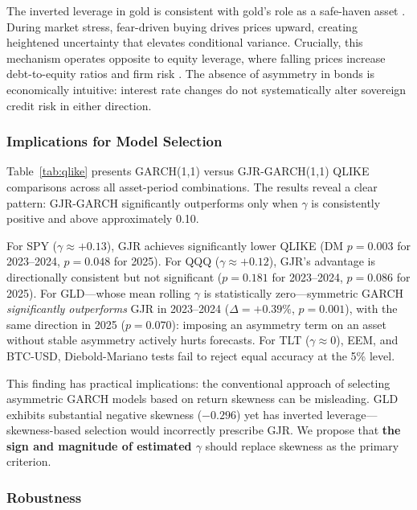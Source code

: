 The inverted leverage in gold is consistent with gold's role as a safe-haven asset \citep{baur2010safe,baur2010hedge}. During market stress, fear-driven buying drives prices upward, creating heightened uncertainty that elevates conditional variance. Crucially, this mechanism operates opposite to equity leverage, where falling prices increase debt-to-equity ratios and firm risk \citep{black1976,christie1982}. The absence of asymmetry in bonds is economically intuitive: interest rate changes do not systematically alter sovereign credit risk in either direction.

\subsubsection{Implications for Model Selection}
\label{sec:model_selection}

Table~\ref{tab:qlike} presents GARCH(1,1) versus GJR-GARCH(1,1) QLIKE comparisons across all asset-period combinations. The results reveal a clear pattern: GJR-GARCH significantly outperforms only when $\gamma$ is consistently positive and above approximately 0.10.

For SPY ($\gamma \approx +0.13$), GJR achieves significantly lower QLIKE (DM $p = 0.003$ for 2023--2024, $p = 0.048$ for 2025). For QQQ ($\gamma \approx +0.12$), GJR's advantage is directionally consistent but not significant ($p = 0.181$ for 2023--2024, $p = 0.086$ for 2025). For GLD---whose mean rolling $\gamma$ is statistically zero---symmetric GARCH \emph{significantly outperforms} GJR in 2023--2024 ($\Delta = +0.39\%$, $p = 0.001$), with the same direction in 2025 ($p = 0.070$): imposing an asymmetry term on an asset without stable asymmetry actively hurts forecasts. For TLT ($\gamma \approx 0$), EEM, and BTC-USD, Diebold-Mariano tests fail to reject equal accuracy at the 5\% level.

This finding has practical implications: the conventional approach of selecting asymmetric GARCH models based on return skewness can be misleading. GLD exhibits substantial negative skewness ($-0.296$) yet has inverted leverage---skewness-based selection would incorrectly prescribe GJR. We propose that \textbf{the sign and magnitude of estimated $\gamma$} should replace skewness as the primary criterion.

\subsubsection{Robustness}

